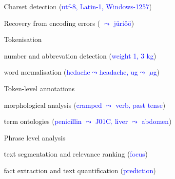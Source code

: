 \documentclass[landscape,footrule]{foils}
\begin{document}
\begin{minipage}[b]{17cm}
\begin{triangles}
\item Charset detection (\textcolor{blue}{utf-8, Latin-1, Windows-1257})
\item Recovery from encoding errors (\textcolor{blue}{\hspace*{-0.2ex} $\leadsto$ j\"uri\"o\"o}) 
\end{triangles}\vspace*{3ex}
Tokenisation
\begin{triangles}
\item number and abbrevation detection (\textcolor{blue}{weight 1, 3 kg})
\item word normalisation (\textcolor{blue}{hedache$\leadsto$headache, ug$\leadsto$ $\mu$g})
\end{triangles}\vspace*{3ex}

Token-level annotations 

\begin{triangles}
\item morphological analysis (\textcolor{blue}{cramped $\leadsto$ verb, past tense})
\item term ontologies (\textcolor{blue}{penicillin $\leadsto$ J01C, liver $\leadsto$ abdomen})
\end{triangles}
\vspace*{3ex}
Phrase level analysis
\begin{triangles}
\item text segmentation and relevance ranking (\textcolor{blue}{focus})
\item fact extraction and text quantification (\textcolor{blue}{prediction})
\end{triangles}
\end{minipage}

\enlargethispage{1cm}
\end{document}

